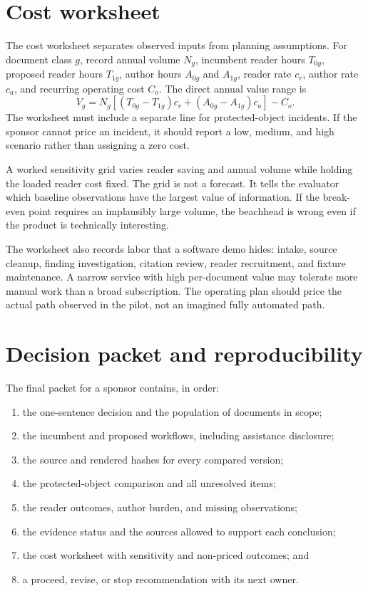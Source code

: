 \section{Cost worksheet}
\label{sec:manual-cost}

The cost worksheet separates observed inputs from planning assumptions. For
document class $g$, record annual volume $N_g$, incumbent reader hours
$T_{0g}$, proposed reader hours $T_{1g}$, author hours $A_{0g}$ and $A_{1g}$,
reader rate $c_r$, author rate $c_a$, and recurring operating cost $C_o$.
The direct annual value range is
\begin{equation}
  V_g =
  N_g\left[(T_{0g}-T_{1g})c_r+(A_{0g}-A_{1g})c_a\right]-C_o.
  \label{eq:manual-cost-range}
\end{equation}
The worksheet must include a separate line for protected-object incidents.
If the sponsor cannot price an incident, it should report a low, medium, and
high scenario rather than assigning a zero cost.

A worked sensitivity grid varies reader saving and annual volume while holding
the loaded reader cost fixed. The grid is not a forecast. It tells the evaluator
which baseline observations have the largest value of information. If the
break-even point requires an implausibly large volume, the beachhead is wrong
even if the product is technically interesting.

The worksheet also records labor that a software demo hides: intake, source
cleanup, finding investigation, citation review, reader recruitment, and
fixture maintenance. A narrow service with high per-document value may tolerate
more manual work than a broad subscription. The operating plan should price
the actual path observed in the pilot, not an imagined fully automated path.

\section{Decision packet and reproducibility}
\label{sec:manual-packet}

The final packet for a sponsor contains, in order:

\begin{enumerate}
\item the one-sentence decision and the population of documents in scope;
\item the incumbent and proposed workflows, including assistance disclosure;
\item the source and rendered hashes for every compared version;
\item the protected-object comparison and all unresolved items;
\item the reader outcomes, author burden, and missing observations;
\item the evidence status and the sources allowed to support each conclusion;
\item the cost worksheet with sensitivity and non-priced outcomes; and
\item a proceed, revise, or stop recommendation with its next owner.
\end{enumerate}

